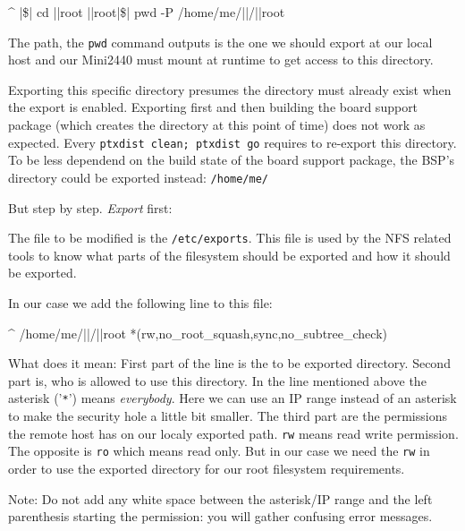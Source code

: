 \begin{ptxshell}[escapechar=|]{^}
|\$| cd |\ptxdistPlatformDir |root
|\ptxdistPlatformDir |root|\$| pwd -P
/home/me/|\ptxdistBSPName |/|\ptxdistPlatformDir |root
\end{ptxshell}

The path, the \texttt{pwd} command outputs is the one we should export at our local
host and our Mini2440 must mount at runtime to get access to this directory.

\begin{important}
Exporting this specific directory presumes the directory must already exist when the export
is enabled. Exporting first and then building the board support package (which creates the
directory at this point of time) does not work as expected. Every \texttt{ptxdist clean; ptxdist go}
requires to re-export this directory.\\
To be less dependend on the build state of the board support package, the BSP's directory
could be exported instead: \texttt{/home/me/\ptxdistBSPName }
\end{important}

But step by step. \textit{Export} first:

The file to be modified is the \texttt{/etc/exports}. This file is used by the NFS related
tools to know what parts of the filesystem should be exported and how it should be exported.

In our case we add the following line to this file:

\begin{ptxshell}[escapechar=|]{^}
/home/me/|\ptxdistBSPName |/|\ptxdistPlatformDir |root *(rw,no_root_squash,sync,no_subtree_check)
\end{ptxshell}

What does it mean: First part of the line is the to be exported directory. Second part is,
who is allowed to use this directory. In the line mentioned above the asterisk ('\texttt{*}')
means \textit{everybody}. Here we can use an IP range instead of an asterisk to make the
security hole a little bit smaller. The third part are the permissions the remote host has
on our localy exported path. \texttt{rw} means read write permission. The opposite is
\texttt{ro} which means read only. But in our case we need the \texttt{rw} in order to use
the exported directory for our root filesystem requirements.

Note: Do not add any white space between the asterisk/IP range and the left parenthesis
starting the permission: you will gather confusing error messages.

